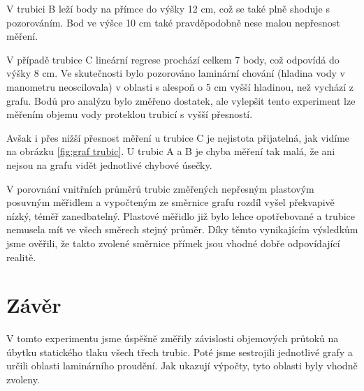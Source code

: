     V trubici B leží body na přímce do výšky 12 cm, což se také plně shoduje s pozorováním. Bod ve výšce 10 cm také pravděpodobně nese malou nepřesnost měření.

    V případě trubice C lineární regrese prochází celkem 7 body, což odpovídá do výšky 8 cm. Ve skutečnosti bylo pozorováno laminární chování (hladina vody v manometru neoscilovala) v oblasti s alespoň o 5 cm vyšší hladinou, než vychází z grafu. Bodů pro analýzu bylo změřeno dostatek, ale vylepšit tento experiment lze měřením objemu vody proteklou trubicí s vyšší přesností.

    Avšak i přes nižší přesnost měření u trubice C je nejistota přijatelná, jak vidíme na obrázku \ref{fig:graf trubic}. U trubic A a B je chyba měření tak malá, že ani nejsou na grafu vidět jednotlivé chybové úsečky.

    V porovnání vnitřních průměrů trubic změřených nepřesným plastovým posuvným měřidlem a vypočteným ze směrnice grafu rozdíl vyšel překvapivě nízký, téměř zanedbatelný. Plastové měřidlo již bylo lehce opotřebované a trubice nemusela mít ve všech směrech stejný průměr. Díky těmto vynikajícím výsledkům jsme ověřili, že takto zvolené směrnice přímek jsou vhodné dobře odpovídající realitě.

\section{Závěr}

    V tomto experimentu jsme úspěšně změřily závislosti objemových průtoků na úbytku statického tlaku všech třech trubic. Poté jsme sestrojili jednotlivé grafy a určili oblasti laminárního proudění. Jak ukazují výpočty, tyto oblasti byly vhodně zvoleny.
